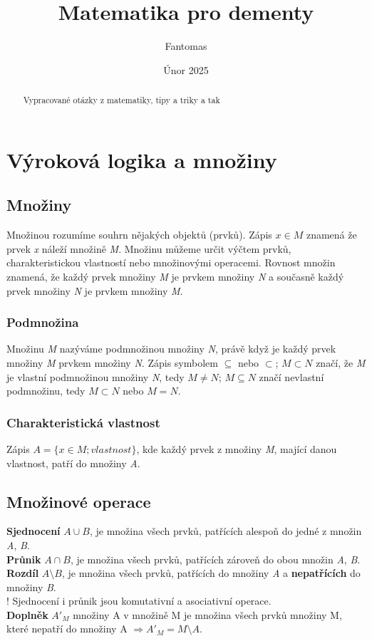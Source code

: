 \documentclass[12pt, a4paper]{article}
\title{Matematika pro dementy}
\author{Fantomas}
\date{Únor 2025}
\begin{document}
\maketitle
\pagebreak
\begin{abstract}
Vypracované otázky z matematiky, tipy a triky a tak
\end{abstract}

\pagebreak
\section{Výroková logika a množiny}

\subsection*{Množiny}
Množinou rozumíme souhrn nějakých objektů (prvků). Zápis $x \in M$ znamená že prvek \textit{x} náleží množině \textit{M}. Množinu můžeme určit výčtem prvků, charakteristickou vlastností nebo 
množinovými operacemi. Rovnost množin znamená, že každý prvek množiny \textit{M} je prvkem množiny \textit{N} a současně každý prvek množiny \textit{N} je prvkem množiny \textit{M}.

\subsubsection*{Podmnožina}
Množinu \textit{M} nazýváme podmnožinou množiny \textit{N}, právě když je každý prvek množiny \textit{M} prvkem množiny \textit{N}. Zápis symbolem $\subseteq$ nebo $\subset$; $M\subset N$ značí, že \textit{M} je vlastní podmnožinou množiny \textit{N}, tedy $M \neq N$; $M \subseteq N$ značí nevlastní podmnožinu, tedy $M \subset N$ nebo $M = N$.

\subsubsection*{Charakteristická vlastnost}
Zápis $A=\{x \in M; vlastnost\}$, kde každý prvek z množiny \textit{M}, mající danou vlastnost, patří do množiny \textit{A}.

\subsection*{Množinové operace}
\textbf{Sjednocení} $A \cup B$, je množina všech prvků, patřících alespoň do jedné z množin \textit{A}, \textit{B}.\\
\textbf{Průnik} $A \cap B$, je množina všech prvků, patřících zároveň do obou množin \textit{A}, \textit{B}.\\
\textbf{Rozdíl} $A \setminus B$, je množina všech prvků, patřících do množiny \textit{A} a \textbf{nepatřících} do množiny \textit{B}.\\
! Sjednocení i průnik jsou komutativní a asociativní operace.\\
\textbf{Doplněk} $A'_M $ množiny A v množině M je množina všech prvků množiny M, které nepatří do množiny A $\Rightarrow A'_M = M \setminus A$.
\end{document}

